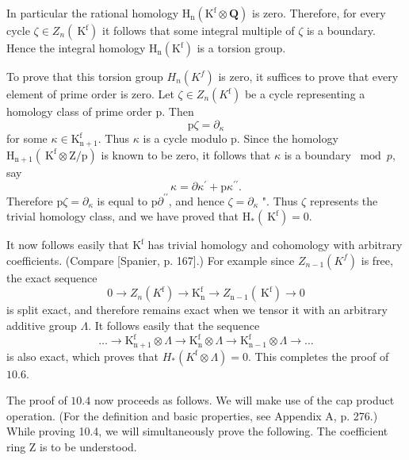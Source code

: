 \documentclass[10pt]{article}
\begin{document}
In particular the rational homology $\mathrm{H}_{\mathrm{n}}\left(\mathrm{K}^{\mathrm{f}} \otimes \mathbf{Q}\right)$ is zero. Therefore, for every cycle $\zeta \in Z_{n}\left(\mathrm{~K}^{\mathrm{f}}\right)$ it follows that some integral multiple of $\zeta$ is a boundary. Hence the integral homology $\mathrm{H}_{\mathrm{n}}\left(\mathrm{K}^{\mathrm{f}}\right)$ is a torsion group.

To prove that this torsion group $H_{n}\left(K^{f}\right)$ is zero, it suffices to prove that every element of prime order is zero. Let $\zeta \in Z_{n}\left(K^{\mathrm{f}}\right)$ be a cycle representing a homology class of prime order p. Then
$$
\mathrm{p} \zeta=\partial_{\kappa}
$$
for some $\kappa \in \mathrm{K}_{\mathrm{n}+1}^{\mathrm{f}}$. Thus $\kappa$ is a cycle modulo p. Since the homology $\mathrm{H}_{\mathrm{n}+1}\left(\mathrm{~K}^{\mathrm{f}} \otimes \mathrm{Z} / \mathrm{p}\right)$ is known to be zero, it follows that $\kappa$ is a boundary $\bmod p$, say
$$
\kappa=\partial \kappa^{\prime}+\mathrm{p} \kappa^{\prime \prime} .
$$
Therefore $\mathrm{p} \zeta=\partial_{\kappa}$ is equal to $\mathrm{p} \partial^{\prime \prime}$, and hence $\zeta=\partial_{\kappa}$ ". Thus $\zeta$ represents the trivial homology class, and we have proved that $\mathrm{H}_{*}\left(\mathrm{~K}^{\mathrm{f}}\right)=0$.

It now follows easily that $\mathrm{K}^{\mathrm{f}}$ has trivial homology and cohomology with arbitrary coefficients. (Compare [Spanier, p. 167].) For example since $Z_{n-1}\left(K^{f}\right)$ is free, the exact sequence
$$
0 \rightarrow Z_{n}\left(K^{\mathrm{f}}\right) \rightarrow \mathrm{K}_{\mathrm{n}}^{\mathrm{f}} \rightarrow Z_{\mathrm{n}-1}\left(\mathrm{~K}^{\mathrm{f}}\right) \rightarrow 0
$$
is split exact, and therefore remains exact when we tensor it with an arbitrary additive group $\Lambda$. It follows easily that the sequence
$$
\ldots \rightarrow \mathrm{K}_{\mathrm{n}+1}^{\mathrm{f}} \otimes \Lambda \rightarrow \mathrm{K}_{\mathrm{n}}^{\mathrm{f}} \otimes \Lambda \rightarrow \mathrm{K}_{\mathrm{n}-1}^{\mathrm{f}} \otimes \Lambda \rightarrow \ldots
$$
is also exact, which proves that $H_{*}\left(K^{\mathrm{f}} \otimes \Lambda\right)=0$. This completes the proof of $10.6$.

The proof of $10.4$ now proceeds as follows. We will make use of the cap product operation. (For the definition and basic properties, see Appendix A, p. 276.) While proving 10.4, we will simultaneously prove the following. The coefficient ring $\mathrm{Z}$ is to be understood.
\end{document}
